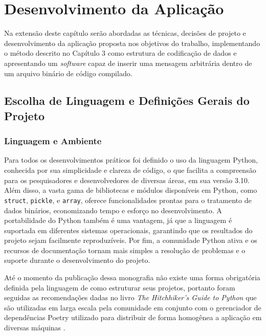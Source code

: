 \chapter{Desenvolvimento da Aplicação}

Na extensão deste capítulo serão abordadas as técnicas, decisões de projeto e desenvolvimento da aplicação proposta nos objetivos do trabalho, implementando o método descrito no Capítulo 3 como estrutura de codificação de dados e apresentando um \textit{software} capaz de inserir uma mensagem arbitrária dentro de um arquivo binário de código compilado.

\section{Escolha de Linguagem e Definições Gerais do Projeto}

\subsection{Linguagem e Ambiente}

Para todos os desenvolvimentos práticos foi definido o uso da linguagem Python, conhecida por sua simplicidade e clareza de código, o que facilita a compreensão para os pesquisadores e desenvolvedores de diversas áreas, em sua versão 3.10. Além disso, a vasta gama de bibliotecas e módulos disponíveis em Python, como \texttt{struct}, \texttt{pickle}, e \texttt{array}, oferece funcionalidades prontas para o tratamento de dados binários, economizando tempo e esforço no desenvolvimento. A portabilidade do Python também é uma vantagem, já que a linguagem é suportada em diferentes sistemas operacionais, garantindo que os resultados do projeto sejam facilmente reproduzíveis. Por fim, a comunidade Python ativa e os recursos de documentação tornam mais simples a resolução de problemas e o suporte durante o desenvolvimento do projeto.

Até o momento da publicação dessa monografia não existe uma forma obrigatória definida pela linguagem de como estruturar seus projetos, portanto foram seguidas as recomendações dadas no livro \textit{The Hitchhiker's Guide to Python} que são utilizadas em larga escala pela comunidade \cite{reitz2016hitchhiker} em conjunto com o gerenciador de dependências Poetry utilizado para distribuir de forma homogênea a aplicação em diversas máquinas \cite{poetry}.

